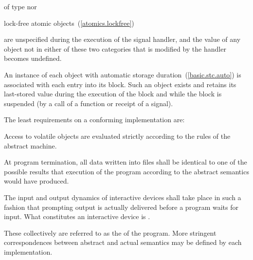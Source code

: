 \begin{compactitem}
\item of type  nor
\item lock-free atomic objects~(\ref{atomics.lockfree})
\end{compactitem}
%
are unspecified during the execution of the signal handler, and the value of any
object not in either of these two categories that is modified by the handler
becomes undefined.%

\pnum
An instance of each object with automatic storage
duration~(\ref{basic.stc.auto}) is associated with each entry into its
block. Such an object exists and retains its last-stored value during
the execution of the block and while the block is suspended (by a call
of a function or receipt of a signal).

\pnum
The least requirements on a conforming implementation are:

\begin{compactitem}

\item
Access to volatile objects are evaluated strictly according to the
rules of the abstract machine.

\item
At program termination, all data written into files shall be
identical to one of the possible results that execution of the program
according to the abstract semantics would have produced.

\item
The input and output dynamics of interactive devices shall take
place in such a fashion that prompting output is actually delivered before a program waits for input. What constitutes an interactive device is
.

\end{compactitem}
%
These collectively are referred to as the
 of the program.
\enternote More stringent correspondences between abstract and actual
semantics may be defined by each implementation. \exitnote

